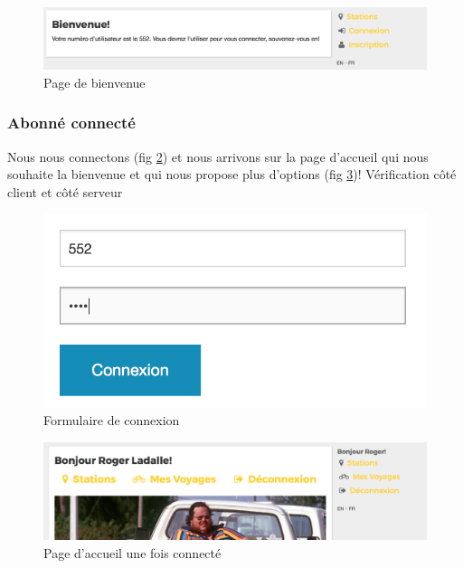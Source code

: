 \documentclass[a4paper]{article}
\begin{document}
    \begin{figure}
    \includegraphics[width=\textwidth]{images/s5.png}
    \caption{Page de bienvenue}
    \label{fig-s5}
    \end{figure}
    
    \subsubsection{Abonné connecté}
    Nous nous connectons (fig \ref{fig-s6}) et nous arrivons sur la page d'accueil qui nous souhaite la bienvenue et qui nous propose plus d'options (fig \ref{fig-s7})!
    Vérification côté client et côté serveur
    
    \begin{figure}
    \begin{center}
    \includegraphics[width=\textwidth/3]{images/s6.png}
    \end{center}
    \caption{Formulaire de connexion}
    \label{fig-s6}
    \end{figure}
    
    \begin{figure}
    \includegraphics[width=\textwidth]{images/s7.png}
    \caption{Page d'accueil une fois connecté}
    \label{fig-s7}
    \end{figure}
    
\end{document}
